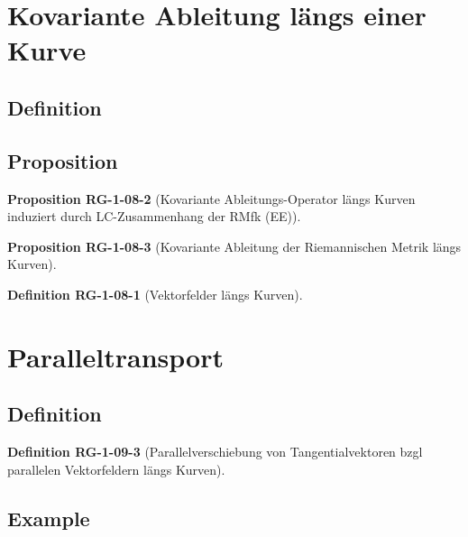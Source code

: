 \documentclass[10pt, letterpaper]{article}
\newcommand{\CustomHeading}[3]{%
  \par\medskip\noindent%
  \textbf{#1 #2} \textnormal{(#3)}.\enskip%
}
\newenvironment{DEF}[2]{\CustomHeading{Definition}{#1}{#2}}{}
\newenvironment{PROP}[2]{\CustomHeading{Proposition}{#1}{#2}}{}
\begin{document}
\section{Kovariante Ableitung längs einer Kurve}

\subsection{Definition}

\subsection{Proposition}



\begin{PROP}{RG-1-08-2}{Kovariante Ableitungs-Operator längs Kurven induziert durch LC-Zusammenhang der RMfk (EE)}

\end{PROP}

\begin{PROP}{RG-1-08-3}{Kovariante Ableitung der Riemannischen Metrik längs Kurven}

\end{PROP}







\begin{DEF}{RG-1-08-1}{Vektorfelder längs Kurven}

\end{DEF}








\section{Paralleltransport}

\subsection{Definition}

\begin{DEF}{RG-1-09-3}{Parallelverschiebung von Tangentialvektoren bzgl parallelen Vektorfeldern längs Kurven}

\end{DEF}





\subsection{Example}
\end{document}

